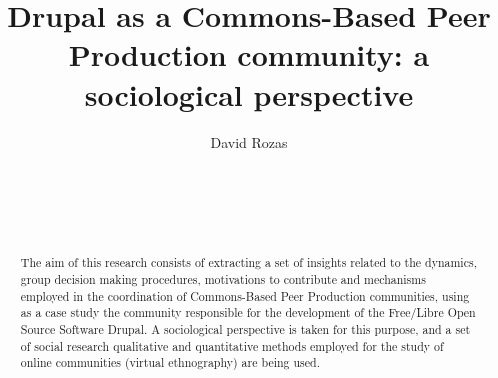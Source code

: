 \documentclass{acm_proc_article-sp}
\begin{document}
\title{Drupal as a Commons-Based Peer Production community: a sociological perspective}

\author{
%
%
\alignauthor
David Rozas\\
       \\
       \\
       \\
       \\     
}

\maketitle
\begin{abstract}
The aim of this research consists of extracting a set of insights related to the dynamics, group decision making procedures, motivations to contribute and mechanisms employed in the coordination of Commons-Based Peer Production communities, using as a case study the community responsible for the development of the Free/Libre Open Source Software Drupal. A sociological perspective is taken for this purpose, and a set of social research qualitative and quantitative methods employed for the study of online communities (virtual ethnography) are being used.  
\end{abstract}


\end{document}
